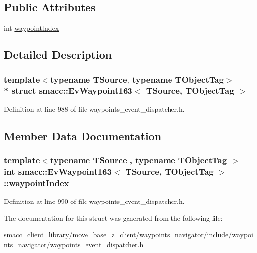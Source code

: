 \subsection*{Public Attributes}
\begin{DoxyCompactItemize}
\item 
int \hyperlink{structsmacc_1_1EvWaypoint163_a9c8586edf37d80c7d2479df79d95da97}{waypoint\+Index}
\end{DoxyCompactItemize}


\subsection{Detailed Description}
\subsubsection*{template$<$typename T\+Source, typename T\+Object\+Tag$>$\\*
struct smacc\+::\+Ev\+Waypoint163$<$ T\+Source, T\+Object\+Tag $>$}



Definition at line 988 of file waypoints\+\_\+event\+\_\+dispatcher.\+h.



\subsection{Member Data Documentation}
\subsubsection[{\texorpdfstring{waypoint\+Index}{waypointIndex}}]{\setlength{\rightskip}{0pt plus 5cm}template$<$typename T\+Source , typename T\+Object\+Tag $>$ int {\bf smacc\+::\+Ev\+Waypoint163}$<$ T\+Source, T\+Object\+Tag $>$\+::waypoint\+Index}\hypertarget{structsmacc_1_1EvWaypoint163_a9c8586edf37d80c7d2479df79d95da97}{}\label{structsmacc_1_1EvWaypoint163_a9c8586edf37d80c7d2479df79d95da97}


Definition at line 990 of file waypoints\+\_\+event\+\_\+dispatcher.\+h.



The documentation for this struct was generated from the following file\+:\begin{DoxyCompactItemize}
\item 
smacc\+\_\+client\+\_\+library/move\+\_\+base\+\_\+z\+\_\+client/waypoints\+\_\+navigator/include/waypoints\+\_\+navigator/\hyperlink{waypoints__event__dispatcher_8h}{waypoints\+\_\+event\+\_\+dispatcher.\+h}\end{DoxyCompactItemize}

